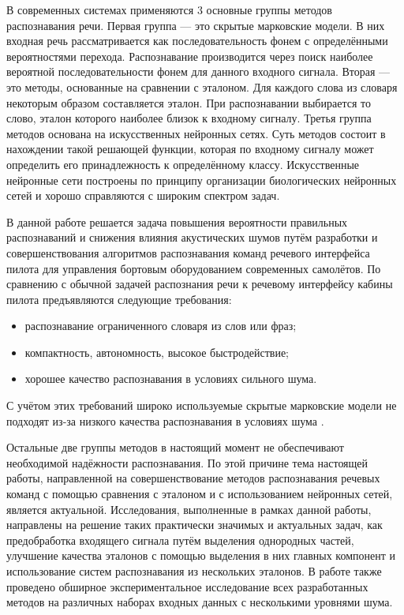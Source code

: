 В современных системах применяются 3 основные группы методов распознавания речи.
Первая группа --- это скрытые марковские модели.
В них входная речь рассматривается как последовательность фонем с определёнными вероятностями перехода.
Распознавание производится через поиск наиболее вероятной последовательности фонем для данного входного сигнала.
Вторая --- это методы, основанные на сравнении с эталоном.
Для каждого слова из словаря некоторым образом составляется эталон.
При распознавании выбирается то слово, эталон которого наиболее близок к входному сигналу.
Третья группа методов основана на искусственных нейронных сетях.
Суть методов состоит в нахождении такой решающей функции, которая по входному сигналу может определить его принадлежность к определённому классу.
Искусственные нейронные сети построены по принципу организации биологических нейронных сетей и хорошо справляются с широким спектром задач.

В данной работе решается задача повышения вероятности правильных распознаваний и снижения влияния акустических шумов путём разработки и совершенствования алгоритмов распознавания команд речевого интерфейса пилота для управления бортовым оборудованием современных самолётов.
По сравнению с обычной задачей распознания речи к речевому интерфейсу кабины пилота предъявляются следующие требования:

\begin{itemize}
	\item распознавание ограниченного словаря из слов или фраз;
	\item компактность, автономность, высокое быстродействие;
	\item хорошее качество распознавания в условиях сильного шума.
\end{itemize}

С учётом этих требований широко используемые скрытые марковские модели не подходят из-за низкого качества распознавания в условиях шума \cite{korsun2013experimental}.

Остальные две группы методов в настоящий момент не обеспечивают необходимой надёжности распознавания.
По этой причине тема настоящей работы, направленной на совершенствование методов распознавания речевых команд с помощью сравнения с эталоном и с использованием нейронных сетей, является актуальной.
Исследования, выполненные в рамках данной работы, направлены на решение таких практически значимых и актуальных задач, как предобработка входящего сигнала путём выделения однородных частей, улучшение качества эталонов с помощью выделения в них главных компонент и использование систем распознавания из нескольких эталонов.
В работе также проведено обширное экспериментальное исследование всех разработанных методов на различных наборах входных данных с несколькими уровнями шума.

